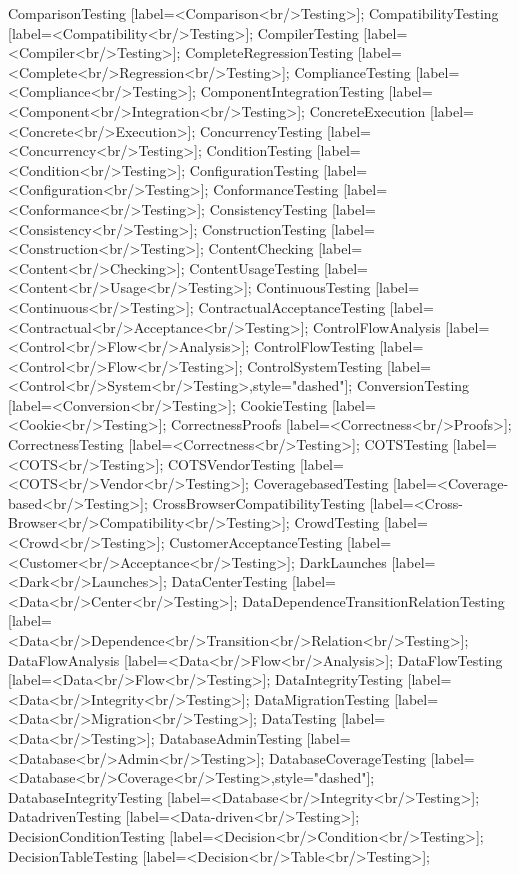\documentclass{article}
\begin{document}
{ComparisonTesting [label=<Comparison<br/>Testing>];
CompatibilityTesting [label=<Compatibility<br/>Testing>];
CompilerTesting [label=<Compiler<br/>Testing>];
CompleteRegressionTesting [label=<Complete<br/>Regression<br/>Testing>];
ComplianceTesting [label=<Compliance<br/>Testing>];
ComponentIntegrationTesting [label=<Component<br/>Integration<br/>Testing>];
ConcreteExecution [label=<Concrete<br/>Execution>];
ConcurrencyTesting [label=<Concurrency<br/>Testing>];
ConditionTesting [label=<Condition<br/>Testing>];
ConfigurationTesting [label=<Configuration<br/>Testing>];
ConformanceTesting [label=<Conformance<br/>Testing>];
ConsistencyTesting [label=<Consistency<br/>Testing>];
ConstructionTesting [label=<Construction<br/>Testing>];
ContentChecking [label=<Content<br/>Checking>];
ContentUsageTesting [label=<Content<br/>Usage<br/>Testing>];
ContinuousTesting [label=<Continuous<br/>Testing>];
ContractualAcceptanceTesting [label=<Contractual<br/>Acceptance<br/>Testing>];
ControlFlowAnalysis [label=<Control<br/>Flow<br/>Analysis>];
ControlFlowTesting [label=<Control<br/>Flow<br/>Testing>];
ControlSystemTesting [label=<Control<br/>System<br/>Testing>,style="dashed"];
ConversionTesting [label=<Conversion<br/>Testing>];
CookieTesting [label=<Cookie<br/>Testing>];
CorrectnessProofs [label=<Correctness<br/>Proofs>];
CorrectnessTesting [label=<Correctness<br/>Testing>];
COTSTesting [label=<COTS<br/>Testing>];
COTSVendorTesting [label=<COTS<br/>Vendor<br/>Testing>];
CoveragebasedTesting [label=<Coverage-based<br/>Testing>];
CrossBrowserCompatibilityTesting [label=<Cross-Browser<br/>Compatibility<br/>Testing>];
CrowdTesting [label=<Crowd<br/>Testing>];
CustomerAcceptanceTesting [label=<Customer<br/>Acceptance<br/>Testing>];
DarkLaunches [label=<Dark<br/>Launches>];
DataCenterTesting [label=<Data<br/>Center<br/>Testing>];
DataDependenceTransitionRelationTesting [label=<Data<br/>Dependence<br/>Transition<br/>Relation<br/>Testing>];
DataFlowAnalysis [label=<Data<br/>Flow<br/>Analysis>];
DataFlowTesting [label=<Data<br/>Flow<br/>Testing>];
DataIntegrityTesting [label=<Data<br/>Integrity<br/>Testing>];
DataMigrationTesting [label=<Data<br/>Migration<br/>Testing>];
DataTesting [label=<Data<br/>Testing>];
DatabaseAdminTesting [label=<Database<br/>Admin<br/>Testing>];
DatabaseCoverageTesting [label=<Database<br/>Coverage<br/>Testing>,style="dashed"];
DatabaseIntegrityTesting [label=<Database<br/>Integrity<br/>Testing>];
DatadrivenTesting [label=<Data-driven<br/>Testing>];
DecisionConditionTesting [label=<Decision<br/>Condition<br/>Testing>];
DecisionTableTesting [label=<Decision<br/>Table<br/>Testing>];
}
\end{document}
